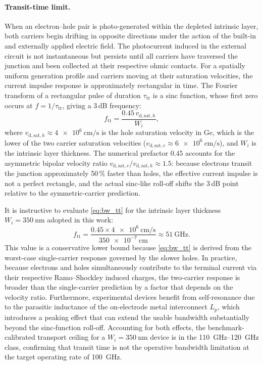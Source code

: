 \paragraph{Transit-time limit.}
When an electron--hole pair is photo-generated within the depleted intrinsic
layer, both carriers begin drifting in opposite directions under the action of
the built-in and externally applied electric field. The photocurrent induced
in the external circuit is not instantaneous but persists until all carriers
have traversed the junction and been collected at their respective ohmic
contacts. For a spatially uniform generation profile and carriers moving at
their saturation velocities, the current impulse response is approximately
rectangular in time. The Fourier transform of a rectangular pulse of duration
$\tau_{\mathrm{tr}}$ is a sinc function, whose first zero occurs at
$f = 1/\tau_{\mathrm{tr}}$, giving a \mbox{3\,dB} frequency:
\begin{equation}
    f_{\mathrm{tt}} = \frac{0.45\,v_{\mathrm{d,sat},h}}{W_i},
    \label{eq:metrics_bw_tt}
\end{equation}
where $v_{\mathrm{d,sat},h} \approx \SI{4e6}{\centi\metre\per\second}$ is the
hole saturation velocity in Ge, which is the lower of the two carrier saturation
velocities ($v_{\mathrm{d,sat},e} \approx \SI{6e6}{\centi\metre\per\second}$),
and $W_i$ is the intrinsic layer thickness. The numerical prefactor $0.45$
accounts for the asymmetric bipolar velocity ratio
$v_{\mathrm{d,sat},e}/v_{\mathrm{d,sat},h} \approx 1.5$: because electrons
transit the junction approximately 50\,\% faster than holes, the effective
current impulse is not a perfect rectangle, and the actual sinc-like roll-off
shifts the \mbox{3\,dB} point relative to the symmetric-carrier prediction.

It is instructive to evaluate \cref{eq:bw_tt} for the intrinsic layer thickness
$W_i = \SI{350}{\nano\metre}$ adopted in this work:
\begin{equation}
    f_{\mathrm{tt}}
    = \frac{0.45 \times \SI{4e6}{\centi\metre\per\second}}
           {\SI{350e-7}{\centi\metre}}
    \approx \SI{51}{\giga\hertz}.
    \label{eq:ftt_numerical}
\end{equation}
This value is a conservative lower bound because \cref{eq:bw_tt} is derived
from the worst-case single-carrier response governed by the slower holes. In
practice, because electrons and holes simultaneously contribute to the
terminal current via their respective Ramo--Shockley induced charges, the
two-carrier response is broader than the single-carrier prediction by a factor
that depends on the velocity ratio. Furthermore, experimental devices benefit
from self-resonance due to the parasitic inductance of the on-electrode metal
interconnect $L_p$, which introduces a peaking effect that can extend the
usable bandwidth substantially beyond the sinc-function roll-off. Accounting
for both effects, the benchmark-calibrated transport ceiling for a
$W_i = \SI{350}{\nano\metre}$ device is in the \SIrange{110}{120}{\giga\hertz}
class, confirming that transit time is not the operative bandwidth limitation
at the target operating rate of \SI{100}{\giga\hertz}.

